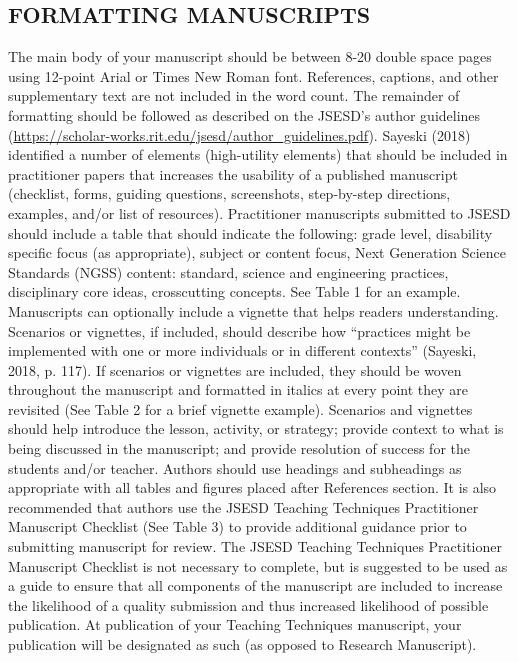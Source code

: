 \documentclass[11.5pt]{sig-alternate} %
\begin{document}
\begin{large}
\section*{FORMATTING MANUSCRIPTS}

The main body of your manuscript should be between 8-20 double space pages using 12-point Arial or Times New Roman font.  References, captions, and other supplementary text are not included in the word count. The remainder of formatting should be followed as described on the JSESD’s author guidelines (\url{https://scholar-works.rit.edu/jsesd/author\_guidelines.pdf}). Sayeski (2018) identified a number of elements (high-utility elements) that should be included in practitioner papers that increases the usability of a published manuscript (checklist, forms, guiding questions, screenshots, step-by-step directions, examples, and/or list of resources). Practitioner manuscripts submitted to JSESD should include a table that should indicate the following: grade level, disability specific focus (as appropriate), subject or content focus, Next Generation Science Standards (NGSS) content: standard, science and engineering practices, disciplinary core ideas, crosscutting concepts.  See Table 1 for an example.  Manuscripts can optionally include a vignette that helps readers understanding. Scenarios or vignettes, if included, should describe how “practices might be implemented with one or more individuals or in different contexts” (Sayeski, 2018, p. 117). If scenarios or vignettes are included, they should be woven throughout the manuscript and formatted in italics at every point they are revisited (See Table 2 for a brief vignette example).  Scenarios and vignettes should help introduce the lesson, activity, or strategy; provide context to what is being discussed in the manuscript; and provide resolution of success for the students and/or teacher.  Authors should use headings and subheadings as appropriate with all tables and figures placed after References section.  It is also recommended that authors use the JSESD Teaching Techniques Practitioner Manuscript Checklist (See Table 3) to provide additional guidance prior to submitting manuscript for review.  The JSESD Teaching Techniques Practitioner Manuscript Checklist is not necessary to complete, but is suggested to be used as a guide to ensure that all components of the manuscript are included to increase the likelihood of a quality submission and thus increased likelihood of possible publication.  At publication of your Teaching Techniques manuscript, your publication will be designated as such (as opposed to Research Manuscript).


\end{large}
\end{document}
